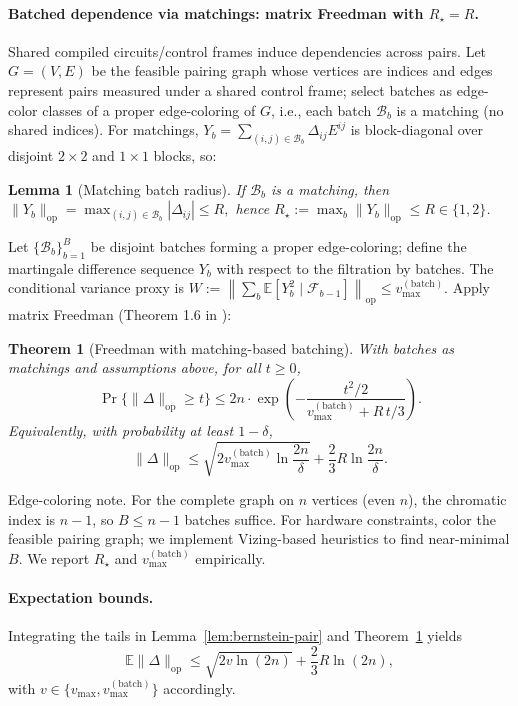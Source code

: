 \documentclass{article}
\newtheorem{theorem}{Theorem}
\newtheorem{lemma}{Lemma}
\begin{document}
\paragraph{Batched dependence via matchings: matrix Freedman with $R_\star=R$.}
Shared compiled circuits/control frames induce dependencies across pairs. Let $G=(V,E)$ be the feasible pairing graph whose vertices are indices and edges represent pairs measured under a shared control frame; select batches as edge-color classes of a proper edge-coloring of $G$, i.e., each batch $\mathcal{B}_b$ is a matching (no shared indices). For matchings, $Y_b=\sum_{(i,j)\in \mathcal{B}_b}\Delta_{ij}E^{ij}$ is block-diagonal over disjoint $2\times 2$ and $1\times 1$ blocks, so:

\begin{lemma}[Matching batch radius]\label{lem:matching-radius}
If $\mathcal{B}_b$ is a matching, then
$\|Y_b\|_{\mathrm{op}}=\max_{(i,j)\in\mathcal{B}_b} |\Delta_{ij}| \le R,$
hence $R_\star:=\max_b \|Y_b\|_{\mathrm{op}}\le R\in\{1,2\}$.
\end{lemma}

Let $\{\mathcal{B}_b\}_{b=1}^B$ be disjoint batches forming a proper edge-coloring; define the martingale difference sequence $Y_b$ with respect to the filtration by batches. The conditional variance proxy is $W:=\left\|\sum_b \mathbb{E}[Y_b^2\mid \mathcal{F}_{b-1}]\right\|_{\mathrm{op}} \le v_{\max}^{(\mathrm{batch})}$. Apply matrix Freedman (Theorem 1.6 in \cite{tropp2012user}):

\begin{theorem}[Freedman with matching-based batching]\label{thm:freedman-matching}
With batches as matchings and assumptions above, for all $t\ge 0$,
\[
\Pr\{\|\Delta\|_{\mathrm{op}} \ge t\} \le 2n \cdot \exp\left( -\frac{t^2/2}{v_{\max}^{(\mathrm{batch})} + R\, t/3} \right).
\]
Equivalently, with probability at least $1-\delta$,
\[
\|\Delta\|_{\mathrm{op}} \le \sqrt{2 v_{\max}^{(\mathrm{batch})}\ln\frac{2n}{\delta}} + \frac{2}{3} R \ln\frac{2n}{\delta}.
\]
\end{theorem}

Edge-coloring note. For the complete graph on $n$ vertices (even $n$), the chromatic index is $n-1$, so $B\le n-1$ batches suffice. For hardware constraints, color the feasible pairing graph; we implement Vizing-based heuristics to find near-minimal $B$. We report $R_\star$ and $v_{\max}^{(\mathrm{batch})}$ empirically.

\paragraph{Expectation bounds.}
Integrating the tails in Lemma~\ref{lem:bernstein-pair} and Theorem~\ref{thm:freedman-matching} yields
\begin{equation}\label{eq:expectation-op}
\mathbb{E}\|\Delta\|_{\mathrm{op}} \le \sqrt{2 v \ln(2n)} + \frac{2}{3} R \ln(2n),
\end{equation}
with $v\in\{v_{\max}, v_{\max}^{(\mathrm{batch})}\}$ accordingly.
\end{document}
